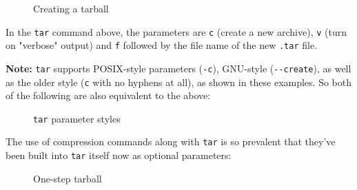 \documentclass[10pt,american,]{book}
\newenvironment{Shaded}{\begin{snugshade}}{\end{snugshade}}
\newcommand{\KeywordTok}[1]{\textcolor[rgb]{0.13,0.29,0.53}{\textbf{{#1}}}}
\newcommand{\NormalTok}[1]{{#1}}
\numberwithin{figure}{chapter}
\DeclareRobustCommand{\drcap}[1]{\begin{figure}[H]\caption{#1}\end{figure}}
\renewcommand{\KeywordTok}[1]{{#1}}
\renewcommand{\NormalTok}[1]{{#1}}
\begin{document}
\drcap{Creating a tarball}

\begin{Shaded}
\end{Shaded}

In the \texttt{tar} command above, the parameters are \texttt{c} (create
a new archive), \texttt{v} (turn on "verbose" output) and \texttt{f}
followed by the file name of the new \texttt{.tar} file.

\textbf{Note:} \texttt{tar} supports POSIX-style parameters
(\texttt{-c}), GNU-style (\texttt{-\/-create}), as well as the older
style (\texttt{c} with no hyphens at all), as shown in these examples.
So both of the following are also equivalent to the above:

\drcap{\texttt{tar} parameter styles}

\begin{Shaded}
\end{Shaded}

The use of compression commands along with \texttt{tar} is so prevalent
that they've been built into \texttt{tar} itself now as optional
parameters:

\drcap{One-step tarball}

\begin{Shaded}
\end{Shaded}
\end{document}
